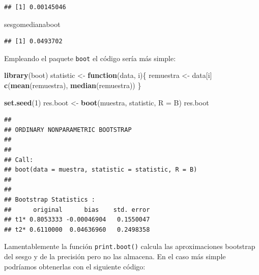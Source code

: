 \documentclass[]{book}
\newenvironment{Shaded}{\begin{snugshade}}{\end{snugshade}}
\newcommand{\KeywordTok}[1]{\textcolor[rgb]{0.13,0.29,0.53}{\textbf{#1}}}
\newcommand{\DataTypeTok}[1]{\textcolor[rgb]{0.13,0.29,0.53}{#1}}
\newcommand{\DecValTok}[1]{\textcolor[rgb]{0.00,0.00,0.81}{#1}}
\newcommand{\StringTok}[1]{\textcolor[rgb]{0.31,0.60,0.02}{#1}}
\newcommand{\OtherTok}[1]{\textcolor[rgb]{0.56,0.35,0.01}{#1}}
\newcommand{\ControlFlowTok}[1]{\textcolor[rgb]{0.13,0.29,0.53}{\textbf{#1}}}
\newcommand{\OperatorTok}[1]{\textcolor[rgb]{0.81,0.36,0.00}{\textbf{#1}}}
\newcommand{\NormalTok}[1]{#1}
\theoremstyle{definition}
\theoremstyle{definition}
\theoremstyle{definition}
\theoremstyle{remark}
\begin{document}
\begin{verbatim}
## [1] 0.00145046
\end{verbatim}

\begin{Shaded}
\begin{Highlighting}[]
\NormalTok{sesgomedianaboot}
\end{Highlighting}
\end{Shaded}

\begin{verbatim}
## [1] 0.0493702
\end{verbatim}

Empleando el paquete \texttt{boot} el código sería más simple:

\begin{Shaded}
\begin{Highlighting}[]
\KeywordTok{library}\NormalTok{(boot)}
\NormalTok{statistic <-}\StringTok{ }\ControlFlowTok{function}\NormalTok{(data, i)\{}
\NormalTok{  remuestra <-}\StringTok{ }\NormalTok{data[i]}
  \KeywordTok{c}\NormalTok{(}\KeywordTok{mean}\NormalTok{(remuestra), }\KeywordTok{median}\NormalTok{(remuestra))}
\NormalTok{\}}

\KeywordTok{set.seed}\NormalTok{(}\DecValTok{1}\NormalTok{)}
\NormalTok{res.boot <-}\StringTok{ }\KeywordTok{boot}\NormalTok{(muestra, statistic, }\DataTypeTok{R =}\NormalTok{ B)}
\NormalTok{res.boot}
\end{Highlighting}
\end{Shaded}

\begin{verbatim}
## 
## ORDINARY NONPARAMETRIC BOOTSTRAP
## 
## 
## Call:
## boot(data = muestra, statistic = statistic, R = B)
## 
## 
## Bootstrap Statistics :
##      original      bias    std. error
## t1* 0.8053333 -0.00046904   0.1550047
## t2* 0.6110000  0.04636960   0.2498358
\end{verbatim}

Lamentablemente la función \texttt{print.boot()} calcula las
aproximaciones bootstrap del sesgo y de la precisión pero no las
almacena. En el caso más simple podríamos obtenerlas con el siguiente
código:

\begin{Shaded}
\end{Shaded}
\end{document}
